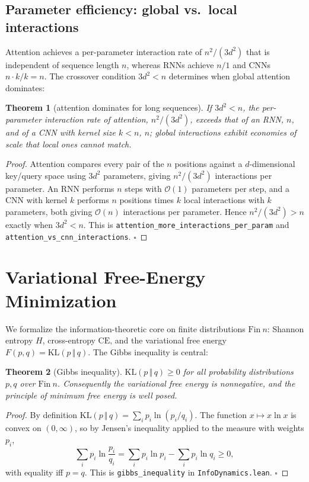 \documentclass[journal]{IEEEtran}
\newtheorem{theorem}{Theorem}
\begin{document}
\subsection{Parameter efficiency: global vs.\ local interactions}
Attention achieves a per-parameter interaction rate of $n^2/(3d^2)$ that is
independent of sequence length $n$, whereas RNNs achieve $n/1$ and CNNs
$n\cdot k/k=n$. The crossover condition $3d^2<n$ determines when global
attention dominates:

\begin{theorem}[attention dominates for long sequences]
\label{thm:attention}
If $3d^2<n$, the per-parameter interaction rate of attention, $n^2/(3d^2)$,
exceeds that of an RNN, $n$, and of a CNN with kernel size $k<n$, $n$; global
interactions exhibit economies of scale that local ones cannot match.
\end{theorem}

\begin{proof}
Attention compares every pair of the $n$ positions against a $d$-dimensional
key/query space using $3d^2$ parameters, giving $n^2/(3d^2)$ interactions per
parameter. An RNN performs $n$ steps with $\mathcal{O}(1)$ parameters per step,
and a CNN with kernel $k$ performs $n$ positions times $k$ local interactions
with $k$ parameters, both giving $\mathcal{O}(n)$ interactions per parameter.
Hence $n^2/(3d^2)>n$ exactly when $3d^2<n$. This is
\texttt{attention\_more\_interactions\_per\_param} and
\texttt{attention\_vs\_cnn\_interactions}. \hfill$\square$
\end{proof}

\section{Variational Free-Energy Minimization}
\label{sec:fem}
We formalize the information-theoretic core on finite distributions
$\mathrm{Fin}\ n$: Shannon entropy $H$, cross-entropy $\mathrm{CE}$, and the
variational free energy $F(p,q)=\mathrm{KL}(p\,\Vert\,q)$. The Gibbs inequality
is central:

\begin{theorem}[Gibbs inequality]
\label{thm:gibbs}
$\mathrm{KL}(p\,\Vert\,q)\ge0$ for all probability distributions $p,q$ over
$\mathrm{Fin}\ n$. Consequently the variational free energy is nonnegative, and
the principle of minimum free energy is well posed.
\end{theorem}

\begin{proof}
By definition
$\mathrm{KL}(p\,\Vert\,q)=\sum_i p_i\ln(p_i/q_i)$. The function
$x\mapsto x\ln x$ is convex on $(0,\infty)$, so by Jensen's inequality applied
to the measure with weights $p_i$,
\begin{equation}
\sum_i p_i\ln\frac{p_i}{q_i}
= \sum_i p_i \ln p_i - \sum_i p_i \ln q_i
\ge 0,
\label{eq:gibbs}
\end{equation}
with equality iff $p=q$. This is \texttt{gibbs\_inequality} in
\texttt{InfoDynamics.lean}. \hfill$\square$
\end{proof}
\end{document}
